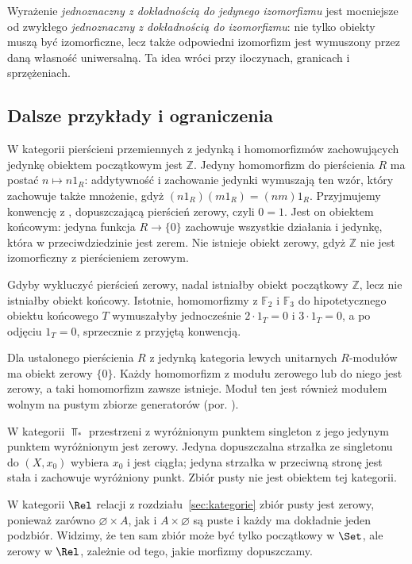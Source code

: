 \begin{uwaga}
Wyrażenie \emph{jednoznaczny z dokładnością do jedynego izomorfizmu} jest mocniejsze od zwykłego \emph{jednoznaczny z dokładnością do izomorfizmu}: nie tylko obiekty muszą być izomorficzne, lecz także odpowiedni izomorfizm jest wymuszony przez daną własność uniwersalną. Ta idea wróci przy iloczynach, granicach i sprzężeniach.
\end{uwaga}

\subsection{Dalsze przykłady i ograniczenia}

\begin{przyklad}\label{cat:ex:initial-ring}
W kategorii pierścieni przemiennych z jedynką i homomorfizmów zachowujących jedynkę obiektem początkowym jest $\mathbb Z$. Jedyny homomorfizm do pierścienia $R$ ma postać $n\mapsto n1_R$: addytywność i zachowanie jedynki wymuszają ten wzór, który zachowuje także mnożenie, gdyż $(n1_R)(m1_R)=(nm)1_R$. Przyjmujemy konwencję z , dopuszczającą pierścień zerowy, czyli $0=1$. Jest on obiektem końcowym: jedyna funkcja $R\to\{0\}$ zachowuje wszystkie działania i jedynkę, która w przeciwdziedzinie jest zerem. Nie istnieje obiekt zerowy, gdyż $\mathbb Z$ nie jest izomorficzny z pierścieniem zerowym.

Gdyby wykluczyć pierścień zerowy, nadal istniałby obiekt początkowy $\mathbb Z$, lecz nie istniałby obiekt końcowy. Istotnie, homomorfizmy z $\mathbb F_2$ i $\mathbb F_3$ do hipotetycznego obiektu końcowego $T$ wymuszałyby jednocześnie $2\cdot1_T=0$ i $3\cdot1_T=0$, a po odjęciu $1_T=0$, sprzecznie z przyjętą konwencją.

Dla ustalonego pierścienia $R$ z jedynką kategoria lewych unitarnych $R$-modułów ma obiekt zerowy $\{0\}$. Każdy homomorfizm z modułu zerowego lub do niego jest zerowy, a taki homomorfizm zawsze istnieje. Moduł ten jest również modułem wolnym na pustym zbiorze generatorów (por. ).
\end{przyklad}

\begin{przyklad}\label{cat:ex:pointed-zero}
W kategorii $\Top_*$ przestrzeni z wyróżnionym punktem singleton z jego jedynym punktem wyróżnionym jest zerowy. Jedyna dopuszczalna strzałka ze singletonu do $(X,x_0)$ wybiera $x_0$ i jest ciągła; jedyna strzałka w przeciwną stronę jest stała i zachowuje wyróżniony punkt. Zbiór pusty nie jest obiektem tej kategorii.

W kategorii $\Rel$ relacji z rozdziału~\ref{sec:kategorie} zbiór pusty jest zerowy, ponieważ zarówno $\varnothing\times A$, jak i $A\times\varnothing$ są puste i każdy ma dokładnie jeden podzbiór. Widzimy, że ten sam zbiór może być tylko początkowy w $\Set$, ale zerowy w $\Rel$, zależnie od tego, jakie morfizmy dopuszczamy.
\end{przyklad}

